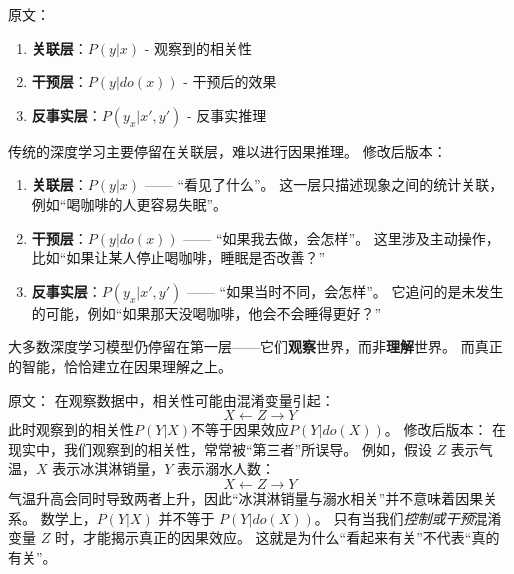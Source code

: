 原文：
\begin{enumerate}
\item \textbf{关联层}：$P(y|x)$ - 观察到的相关性
\item \textbf{干预层}：$P(y|do(x))$ - 干预后的效果
\item \textbf{反事实层}：$P(y_x|x', y')$ - 反事实推理
\end{enumerate}
传统的深度学习主要停留在关联层，难以进行因果推理。
修改后版本：
\begin{enumerate}
\item \textbf{关联层}：$P(y|x)$ —— “看见了什么”。  
    这一层只描述现象之间的统计关联，例如“喝咖啡的人更容易失眠”。  
\item \textbf{干预层}：$P(y|do(x))$ —— “如果我去做，会怎样”。  
    这里涉及主动操作，比如“如果让某人停止喝咖啡，睡眠是否改善？”  
\item \textbf{反事实层}：$P(y_x|x',y')$ —— “如果当时不同，会怎样”。  
    它追问的是未发生的可能，例如“如果那天没喝咖啡，他会不会睡得更好？”  
\end{enumerate}
大多数深度学习模型仍停留在第一层——它们\textbf{观察}世界，而非\textbf{理解}世界。  
而真正的智能，恰恰建立在因果理解之上。



原文：
在观察数据中，相关性可能由混淆变量引起：
$$X \leftarrow Z \rightarrow Y$$
此时观察到的相关性$P(Y|X)$不等于因果效应$P(Y|do(X))$。
修改后版本：
在现实中，我们观察到的相关性，常常被“第三者”所误导。  
例如，假设 $Z$ 表示气温，$X$ 表示冰淇淋销量，$Y$ 表示溺水人数：  
$$X \leftarrow Z \rightarrow Y$$  
气温升高会同时导致两者上升，因此“冰淇淋销量与溺水相关”并不意味着因果关系。  
数学上，$P(Y|X)$ 并不等于 $P(Y|do(X))$。  
只有当我们\textit{控制或干预}混淆变量 $Z$ 时，才能揭示真正的因果效应。  
这就是为什么“看起来有关”不代表“真的有关”。



